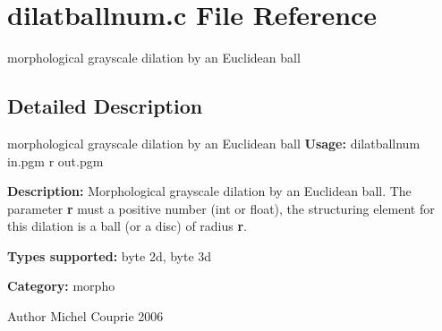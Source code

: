 \section{dilatballnum.c File Reference}
\label{dilatballnum_8c}


morphological grayscale dilation by an Euclidean ball  




\subsection{Detailed Description}
morphological grayscale dilation by an Euclidean ball {\bfseries Usage:} dilatballnum in.pgm r out.pgm

{\bfseries Description:} Morphological grayscale dilation by an Euclidean ball. The parameter {\bfseries r} must a positive number (int or float), the structuring element for this dilation is a ball (or a disc) of radius {\bfseries r}.

{\bfseries Types supported:} byte 2d, byte 3d

{\bfseries Category:} morpho

\begin{DoxyAuthor}{Author}
Michel Couprie 2006 
\end{DoxyAuthor}

